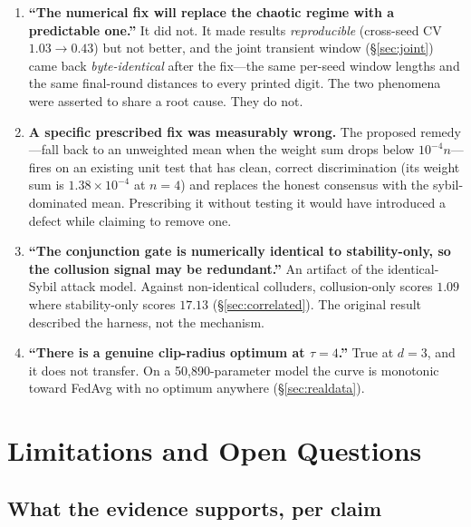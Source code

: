 \documentclass[11pt,a4paper]{article}
\begin{document}
\begin{enumerate}
  \item \textbf{``The numerical fix will replace the chaotic regime with a
    predictable one.''} It did not. It made results \emph{reproducible}
    (cross-seed CV $1.03 \rightarrow 0.43$) but not better, and the joint
    transient window (\S\ref{sec:joint}) came back \emph{byte-identical}
    after the fix---the same per-seed window lengths and the same
    final-round distances to every printed digit. The two phenomena were
    asserted to share a root cause. They do not.

  \item \textbf{A specific prescribed fix was measurably wrong.} The
    proposed remedy---fall back to an unweighted mean when the weight sum
    drops below $10^{-4}n$---fires on an existing unit test that has clean,
    correct discrimination (its weight sum is $1.38\times10^{-4}$ at
    $n=4$) and replaces the honest consensus with the sybil-dominated
    mean. Prescribing it without testing it would have introduced a defect
    while claiming to remove one.

  \item \textbf{``The conjunction gate is numerically identical to
    stability-only, so the collusion signal may be redundant.''} An
    artifact of the identical-Sybil attack model. Against non-identical
    colluders, collusion-only scores $1.09$ where stability-only scores
    $17.13$ (\S\ref{sec:correlated}). The original result described the
    harness, not the mechanism.

  \item \textbf{``There is a genuine clip-radius optimum at $\tau=4$.''}
    True at $d=3$, and it does not transfer. On a 50{,}890-parameter model
    the curve is monotonic toward FedAvg with no optimum anywhere
    (\S\ref{sec:realdata}).
\end{enumerate}

\section{Limitations and Open Questions}
\label{sec:limits}

\subsection{What the evidence supports, per claim}
\end{document}
